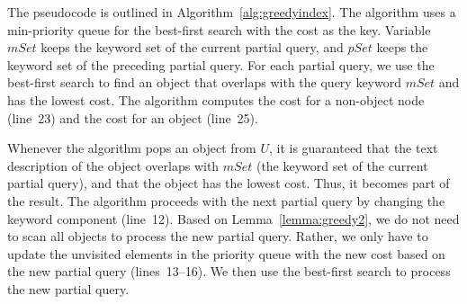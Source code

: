 \documentclass{sig-alternate}
\begin{document}
The pseudocode is outlined in Algorithm~\ref{alg:greedyindex}. The
algorithm uses a min-priority queue for the best-first search with the
cost as the key.
%
Variable $mSet$ keeps the keyword set of the current partial query,
and $pSet$ keeps the keyword set of the preceding partial query.
%
For each partial query, we use the best-first search to find an object
that overlaps with the query keyword $mSet$ and has the lowest cost.
%
The algorithm computes the cost for a non-object node (line~23) and the
cost for an object (line~25).

Whenever the algorithm pops an object from $U$, it is guaranteed
that the text description of the object overlaps with $mSet$ (the
keyword set of the current partial query), and that the object has
the lowest cost. Thus, it becomes part of the result.
%
The algorithm proceeds with the next partial query by changing the
keyword component (line~12). Based on Lemma~\ref{lemma:greedy2}, we do
not need to scan all objects to process the new partial query.
%
Rather, we only have to update the unvisited elements in the priority
queue with the new cost based on the new partial query
(lines~13--16). We then use the best-first search to process the new
partial query.
\end{document}
